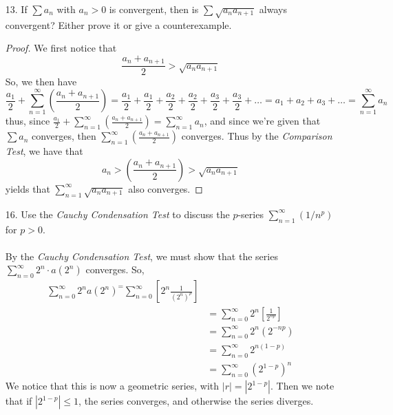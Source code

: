 \documentclass[12pt,letterpaper]{article}
\theoremstyle{case}
\theoremstyle{definition}
\begin{document}
\begin{enumerate}
\begin{enumerate}
			\item[13.] If $\sum a_n$ with $a_n>0$ is convergent, then is $\sum \sqrt{a_na_{n+1}}$ always convergent? Either prove it or give a counterexample.
			\begin{proof}
				We first notice that 
				\[\frac{a_n+a_{n+1}}{2} > \sqrt{a_na_{n+1}}\]
				So, we then have
				\[\frac{a_1}{2}+\sum_{n=1}^{\infty} \left(\frac{a_n+a_{n+1}}{2}\right)=\frac{a_1}{2}+\frac{a_1}{2}+\frac{a_2}{2}+\frac{a_2}{2} + \frac{a_3}{2} + \frac{a_3}{2} + \dots = a_1+a_2+a_3+\dots = \sum_{n=1}^{\infty}a_n\]
				thus, since $\frac{a_1}{2}+ \displaystyle\sum_{n=1}^{\infty} \left(\frac{a_n+a_{n+1}}{2}\right)=\displaystyle\sum_{n=1}^{\infty}a_n$, and since we're given that $\sum a_n$ converges, then $\displaystyle\sum_{n=1}^{\infty} \left(\frac{a_n+a_{n+1}}{2}\right)$ converges. Thus by the \textit{Comparison Test}, we have that 
				\[a_n > \left(\frac{a_n+a_{n+1}}{2}\right)>\sqrt{a_na_{n+1}}\]
				yields that $\displaystyle\sum_{n=1}^{\infty} \sqrt{a_na_{n+1}}$ also converges.
			\end{proof}
			
			\item[16.] Use the \textit{Cauchy Condensation Test} to discuss the $p$-series $\displaystyle\sum_{n=1}^{\infty} (1/n^p)$ for $p>0$.
			\\\\By the \textit{Cauchy Condensation Test}, we must show that the series $\displaystyle\sum_{n=0}^{\infty}2^n\cdot a(2^n)$ converges. So,
			\begin{align*}
				\sum_{n=0}^{\infty} 2^na(2^n) ^= \sum_{n=0}^{\infty} \left[2^n\frac{1}{(2^n)^p}\right] \\
				&= \sum_{n=0}^{\infty} 2^n \left[\frac{1}{2^{np}}\right] \\
				&= \sum_{n=0}^{\infty} 2^n (2^{-np}) \\
				&= \sum_{n=0}^{\infty} 2^{n(1-p)} \\
				&= \sum_{n=0}^{\infty} (2^{1-p})^n
			\end{align*}
			We notice that this is now a geometric series, with $|r|=|2^{1-p}|$. Then we note that if $|2^{1-p}| \leq 1$, the series converges, and otherwise the series diverges.\\\\
		

\end{enumerate}
\end{enumerate}
\end{document}

